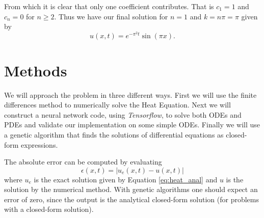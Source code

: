 \documentclass[aps,reprint,superscriptaddress,nofootinbib]{revtex4-2}
\begin{document}
    From which it is clear that only one coefficient contributes. That is $c_1 = 1$ and $c_n = 0$ for $n \geq 2$. Thus we have our final solution for $n=1$ and $k = n\pi = \pi$ given by
    \begin{equation} \label{eq:heat_anal}
        u(x,t)=e^{-\pi^2t}\sin(\pi x).
    \end{equation}
    
    
\section{Methods}

    We will approach the problem in three different ways. First we will use the finite differences method to numerically solve the Heat Equation. Next we will construct a neural network code, using \textit{Tensorflow}, to solve both ODEs and PDEs and validate our implementation on some simple ODEs. Finally we will use a genetic algorithm that finds the solutions of differential equations as closed-form expressions.
    
    The absolute  error can be computed by evaluating
    \begin{equation*}
        \epsilon (x, t) = |u_e(x, t) - u(x, t)|
    \end{equation*}
    where \(u_e\) is the exact solution given by Equation \eqref{eq:heat_anal} and \(u\) is the solution by the numerical method. With genetic algorithms one should expect an error of zero, since the output is the analytical closed-form solution (for problems with a closed-form solution).
\end{document}
